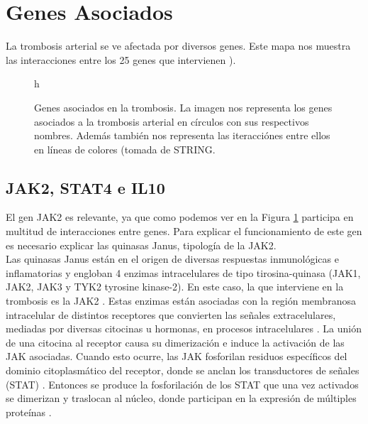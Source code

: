 \section{Genes Asociados}
		La trombosis arterial se ve afectada por diversos genes. Este mapa nos muestra las interacciones entre los 25 genes que intervienen ).
		
    \begin{figure}h
        \centering
    	\textwidth{figures/genes_asociados.png}
    	\caption{Genes asociados en la trombosis. La imagen nos representa los genes asociados a la trombosis arterial en círculos con sus respectivos nombres. Además también nos representa las iteracciónes entre ellos en líneas de colores (tomada de STRING\cite{grafo}.}
    	\label{fig: Figura 2}
      \end{figure}
\subsection{\textbf {JAK2, STAT4 e IL10}}

          El gen JAK2 es relevante, ya que como podemos ver en la Figura \ref{fig: Figura 2}  participa en multitud de interacciones entre genes. Para explicar el funcionamiento de este gen es necesario explicar las quinasas Janus, tipología de la JAK2.\\
		
		Las quinasas Janus están en el origen de diversas respuestas inmunológicas e inflamatorias y engloban 4 enzimas intracelulares de tipo tirosina-quinasa (JAK1, JAK2, JAK3 y TYK2 tyrosine kinase-2). En este caso, la que interviene en la trombosis es la JAK2 \cite{JAK2}. Estas enzimas están asociadas con la región membranosa intracelular de distintos receptores que convierten las señales extracelulares, mediadas por diversas citocinas u hormonas, en procesos intracelulares \cite{JAK2}. La unión de una citocina al receptor causa su dimerización e induce la activación de las JAK asociadas. Cuando esto ocurre, las JAK fosforilan residuos específicos del dominio citoplasmático del receptor, donde se anclan los transductores de señales (STAT) \cite{JAK2} . Entonces se produce la fosforilación de los STAT que una vez activados se dimerizan y traslocan al núcleo, donde participan en la expresión de múltiples proteínas \cite{JAK2}\cite{STAT4}.\\
		
